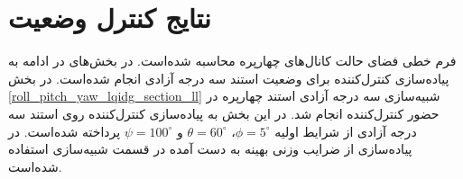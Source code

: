 \documentclass{CCI2020}
\begin{document}
\section{نتایج کنترل وضعیت}\label{3DOF_lqidg_section}
فرم خطی فضای حالت کانال‌های چهارپره محاسبه شده‌است. در بخش‌های
در ادامه به پیاده‌سازی کنترل‌کننده برای وضعیت استند سه درجه آزادی انجام شده‌است.
%
%
%
%
%
در بخش
\ref{roll_pitch_yaw_lqidg_section_ll}
شبیه‌سازی سه درجه آزادی استند چهارپره در حضور کنترل‌کننده  انجام شد. در این بخش به پیاده‌سازی کنترل‌کننده  روی استند سه درجه آزادی از شرایط اولیه
$\phi = 5^{\circ}$،
$\theta = 60^{\circ}$
و
$\psi = 100^{\circ}$
پرداخته شده‌است.
در پیاده‌سازی از ضرایب وزنی بهینه به دست آمده در قسمت شبیه‌سازی استفاده شده‌است.
\end{document}
